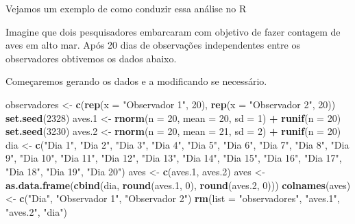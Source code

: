 \documentclass[titlepage, oneside, openany, a4paper]{book}
\newenvironment{Shaded}{\begin{snugshade}}{\end{snugshade}}
\newcommand{\DataTypeTok}[1]{\textcolor[rgb]{0.13,0.29,0.53}{#1}}
\newcommand{\DecValTok}[1]{\textcolor[rgb]{0.00,0.00,0.81}{#1}}
\newcommand{\FloatTok}[1]{\textcolor[rgb]{0.00,0.00,0.81}{#1}}
\newcommand{\KeywordTok}[1]{\textcolor[rgb]{0.13,0.29,0.53}{\textbf{#1}}}
\newcommand{\NormalTok}[1]{#1}
\newcommand{\OperatorTok}[1]{\textcolor[rgb]{0.81,0.36,0.00}{\textbf{#1}}}
\newcommand{\StringTok}[1]{\textcolor[rgb]{0.31,0.60,0.02}{#1}}
\begin{document}
Vejamos um exemplo de como conduzir essa análise no R

Imagine que dois pesquisadores embarcaram com objetivo de fazer contagem de aves em alto mar. Após 20 dias de observações independentes entre os observadores obtivemos os dados abaixo.

Começaremos gerando os dados e a modificando se necessário.

\begin{Shaded}
\begin{Highlighting}[]
\NormalTok{observadores <-}\StringTok{ }\KeywordTok{c}\NormalTok{(}\KeywordTok{rep}\NormalTok{(}\DataTypeTok{x =} \StringTok{"Observador 1"}\NormalTok{, }\DecValTok{20}\NormalTok{), }\KeywordTok{rep}\NormalTok{(}\DataTypeTok{x =} \StringTok{"Observador 2"}\NormalTok{, }\DecValTok{20}\NormalTok{))}
\KeywordTok{set.seed}\NormalTok{(}\DecValTok{2328}\NormalTok{)}
\NormalTok{aves}\FloatTok{.1}\NormalTok{ <-}\StringTok{ }\KeywordTok{rnorm}\NormalTok{(}\DataTypeTok{n =} \DecValTok{20}\NormalTok{, }\DataTypeTok{mean =} \DecValTok{20}\NormalTok{, }\DataTypeTok{sd =} \DecValTok{1}\NormalTok{) }\OperatorTok{+}\StringTok{ }\KeywordTok{runif}\NormalTok{(}\DataTypeTok{n =} \DecValTok{20}\NormalTok{)}
\KeywordTok{set.seed}\NormalTok{(}\DecValTok{3230}\NormalTok{)}
\NormalTok{aves}\FloatTok{.2}\NormalTok{ <-}\StringTok{ }\KeywordTok{rnorm}\NormalTok{(}\DataTypeTok{n =} \DecValTok{20}\NormalTok{, }\DataTypeTok{mean =} \DecValTok{21}\NormalTok{, }\DataTypeTok{sd =} \DecValTok{2}\NormalTok{) }\OperatorTok{+}\StringTok{ }\KeywordTok{runif}\NormalTok{(}\DataTypeTok{n =} \DecValTok{20}\NormalTok{)}
\NormalTok{dia <-}\StringTok{ }\KeywordTok{c}\NormalTok{(}\StringTok{"Dia 1"}\NormalTok{, }\StringTok{"Dia 2"}\NormalTok{, }\StringTok{"Dia 3"}\NormalTok{, }\StringTok{"Dia 4"}\NormalTok{, }\StringTok{"Dia 5"}\NormalTok{, }\StringTok{"Dia 6"}\NormalTok{, }\StringTok{"Dia 7"}\NormalTok{, }\StringTok{"Dia 8"}\NormalTok{, }\StringTok{"Dia 9"}\NormalTok{, }\StringTok{"Dia 10"}\NormalTok{, }\StringTok{"Dia 11"}\NormalTok{, }\StringTok{"Dia 12"}\NormalTok{, }\StringTok{"Dia 13"}\NormalTok{, }\StringTok{"Dia 14"}\NormalTok{, }\StringTok{"Dia 15"}\NormalTok{, }\StringTok{"Dia 16"}\NormalTok{, }\StringTok{"Dia 17"}\NormalTok{, }\StringTok{"Dia 18"}\NormalTok{, }\StringTok{"Dia 19"}\NormalTok{, }\StringTok{"Dia 20"}\NormalTok{)}
\NormalTok{aves <-}\StringTok{ }\KeywordTok{c}\NormalTok{(aves}\FloatTok{.1}\NormalTok{, aves}\FloatTok{.2}\NormalTok{)}
\NormalTok{aves <-}\StringTok{ }\KeywordTok{as.data.frame}\NormalTok{(}\KeywordTok{cbind}\NormalTok{(dia, }\KeywordTok{round}\NormalTok{(aves}\FloatTok{.1}\NormalTok{, }\DecValTok{0}\NormalTok{), }\KeywordTok{round}\NormalTok{(aves}\FloatTok{.2}\NormalTok{, }\DecValTok{0}\NormalTok{)))}
\KeywordTok{colnames}\NormalTok{(aves) <-}\StringTok{ }\KeywordTok{c}\NormalTok{(}\StringTok{"Dia"}\NormalTok{, }\StringTok{"Observador 1"}\NormalTok{, }\StringTok{"Observador 2"}\NormalTok{)}
\KeywordTok{rm}\NormalTok{(}\DataTypeTok{list =} \StringTok{"observadores"}\NormalTok{, }\StringTok{"aves.1"}\NormalTok{, }\StringTok{"aves.2"}\NormalTok{, }\StringTok{"dia"}\NormalTok{)}
\end{Highlighting}
\end{Shaded}
\end{document}
